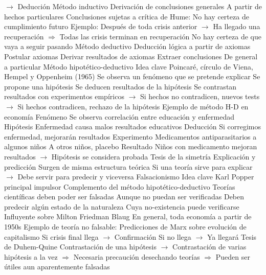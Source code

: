 \documentclass{nuevotema}
\begin{document}
\begin{esquemal}
				\4[] $\to$ Deducción
			\3 Método inductivo
				\4 Derivación de conclusiones generales
				\4[] A partir de hechos particulares
				\4 Conclusiones sujetas a crítica de Hume:
				\4[] No hay certeza de cumplimiento futuro
				\4 Ejemplo:
				\4[] Después de toda crisis anterior
				\4[] $\to$ Ha llegado una recuperación
				\4[] $\Rightarrow$ Todas las crisis terminan en recuperación
				\4[] No hay certeza de que vaya a seguir pasando
			\3 Método deductivo
				\4 Deducción lógica a partir de axiomas
				\4[1] Postular axiomas
				\4[2] Derivar resultados de axiomas
				\4[3] Extraer conclusiones
				\4[$\then$] De general a particular
		\2 Método hipotético-deductivo
			\3 Idea clave
				\4 Poincaré, círculo de Viena, Hempel y Oppenheim (1965)
				\4[1] Se observa un fenómeno que se pretende explicar
				\4[2] Se propone una hipótesis
				\4[3] Se deducen resultados de la hipótesis
				\4[4] Se contrastan resultados con experimentos empíricos
				\4[] $\to$ Si hechos no contradicen, nuevos tests
				\4[] $\to$ Si hechos contradicen, rechazo de la hipótesis
			\3 Ejemplo de método H-D en economía
				\4 Fenómeno
				\4[] Se observa correlación entre educación y enfermedad
				\4 Hipótesis
				\4[] Enfermedad causa malos resultados educativos
				\4 Deducción
				\4[] Si corregimos enfermedad, mejorarán resultados
				\4 Experimento
				\4[] Medicamentos antiparasitarios a algunos niños
				\4[] A otros niños, placebo
				\4 Resultado
				\4[] Niños con medicamento mejoran resultados
				\4[] $\to$ Hipótesis se considera probada
			\3 Tesis de la simetría
				\4 Explicación y predicción
				\4[] Surgen de misma estructura teórica
				\4 Si una teoría sirve para explicar
				\4[] $\to$ Debe servir para predecir y viceversa
		\2 Falsacionismo
			\3 Idea clave
				\4 Karl Popper principal impulsor
				\4 Complemento del método hipotético-deductivo
				\4 Teorías científicas deben poder ser falsadas
				\4[] Aunque no puedan ser verificadas
				\4[] Deben predecir algún estado de la naturaleza
				\4[] Cuya no-existencia puede verificarse
			\3 Influyente sobre
				\4 Milton Friedman
				\4 Blaug
				\4 En general, toda economía a partir de 1950s
			\3 Ejemplo de teoría no falsable:
				\4 Predicciones de Marx sobre evolución de capitalismo
				\4 Si crisis final llega $\to$ Confirmación
				\4[] Si no llega $\to$ Ya llegará
			\3 Tesis de Duhem-Quine
				\4 Contrastación de una hipótesis
				\4[] $\to$ Contrastación de varias hipótesis a la vez
				\4[] $\Rightarrow$ Necesaria precaución desechando teorías
				\4[] $\Rightarrow$ Pueden ser útiles aun aparentemente falsadas

\end{esquemal}
\end{document}
